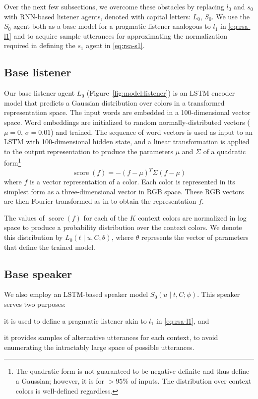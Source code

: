 \documentclass[11pt,letterpaper]{article}
\newcommand{\Listener}{L}
\newcommand{\Speaker}{S}
\newcommand{\utt}{u}
\newcommand{\context}{C}
\newcommand{\contextlen}{K}
\newcommand{\target}{t}
\newcommand{\feat}{f}
\renewcommand{\|}{\mid}
\newcommand{\figref}[1]{Figure~\ref{#1}}
\begin{document}
Over the next few subsections, we overcome these obstacles by
replacing $l_{0}$ and $s_0$ with RNN-based listener agents,
denoted with
capital letters: $\Listener_0$, $\Speaker_0$.
We use the $\Speaker_0$ agent both as a base model for a pragmatic listener
analogous to $l_1$ in \eqref{eq:rsa-l1} and to acquire sample
utterances for approximating the normalization required in defining
the $s_{1}$ agent in \eqref{eq:rsa-s1}.

\subsection{Base listener}

Our base listener agent $\Listener_0$ (\figref{fig:model:listener}) is an LSTM encoder model that predicts a Gaussian
distribution over colors in a transformed representation space.
The input words are embedded in a 100-dimensional vector space. Word embeddings
are initialized to random normally-distributed vectors ($\mu = 0$, $\sigma = 0.01$)
and trained. The sequence of word vectors is
used as input to an LSTM with 100-dimensional hidden state, and a linear
transformation is applied to the output representation to produce the parameters
$\mu$ and $\Sigma$ of a quadratic form\footnote{The quadratic form is not guaranteed 
to be negative definite and thus define a Gaussian; however, it is for $>95$\% of
inputs. The distribution over context colors is well-defined regardless.}
\[\operatorname{score}(\feat) = -(\feat - \mu)^T \Sigma (\feat - \mu)\]
where $\feat$ is a vector representation of a color. Each color is represented in
its simplest form as a three-dimensional vector in
RGB space. These RGB vectors are then Fourier-transformed as in
 to obtain the representation $\feat$.

The values of $\operatorname{score}(\feat)$ for each of the $\contextlen$
context colors are normalized in log space to
produce a probability distribution over the context colors. We denote this
distribution by $\Listener_0(\target \| \utt, \context; \theta)$, where $\theta$ represents the
vector of parameters that define the trained model.

\subsection{Base speaker}\label{sec:s0}

We also employ an LSTM-based speaker model
$\Speaker_0(\utt \| \target, \context; \phi)$. This speaker serves two purposes:
\begin{enumerate*}[label=\arabic*)]
\item it is used to define a pragmatic listener akin to $l_1$ in \eqref{eq:rsa-l1},
and
\item it provides samples of alternative utterances for each context, to avoid
enumerating the intractably large space of possible utterances.
\end{enumerate*}
\end{document}
